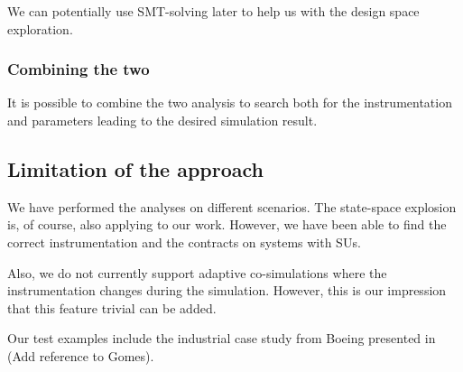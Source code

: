 We can potentially use SMT-solving later to help us with the design space exploration.

\subsubsection{Combining the two}
It is possible to combine the two analysis to search both for the instrumentation and parameters leading to the desired simulation result.





\subsection{Limitation of the approach}
We have performed the analyses on different scenarios. 
The state-space explosion is, of course, also applying to our work. 
However, we have been able to find the correct instrumentation and the contracts on systems with  SUs.

Also, we do not currently support adaptive co-simulations  where the instrumentation changes during the simulation. 
However, this is our impression that this feature trivial can be added. 

Our test examples include the industrial case study from Boeing presented in (Add reference to Gomes). 